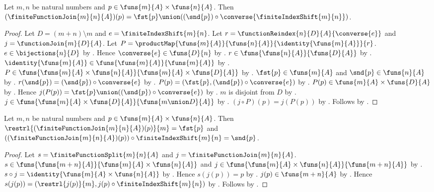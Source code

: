 \begin{theorem}\label{finite_function_join_apply}
    Let $m,n$ be natural numbers and $p\in\funs{m}{A}\times\funs{n}{A}$.
    Then $(\finiteFunctionJoin{m}{n}{A})(p)
        =\fst{p}\union((\snd{p})\circ\converse{\finiteIndexShift{m}{n}})$.
\end{theorem}
\begin{proof}
    Let $D=(m+n)\setminus m$ and $e=\finiteIndexShift{m}{n}$.
    Let $r=\functionReindex{n}{D}{A}{\converse{e}}$ and $j=\functionJoin{m}{D}{A}$.
    Let $P=\productMap{\funs{m}{A}}{\funs{n}{A}}{\identity{\funs{m}{A}}}{r}$.
    $e\in\bijections{n}{D}$ by .
    Hence $\converse{e}\in\funs{D}{n}$ by
        .
    $r\in\funs{\funs{n}{A}}{\funs{D}{A}}$ by .
    $\identity{\funs{m}{A}}\in\funs{\funs{m}{A}}{\funs{m}{A}}$ by .
    $P\in\funs{\funs{m}{A}\times\funs{n}{A}}{\funs{m}{A}\times\funs{D}{A}}$ by
        .
    $\fst{p}\in\funs{m}{A}$ and $\snd{p}\in\funs{n}{A}$ by .
    $r(\snd{p})=(\snd{p})\circ\converse{e}$ by .
    $P(p)=(\fst{p},(\snd{p})\circ\converse{e})$ by .
    $P(p)\in\funs{m}{A}\times\funs{D}{A}$ by .
    Hence $j(P(p))=\fst{p}\union((\snd{p})\circ\converse{e})$ by
        .
    $m$ is disjoint from $D$ by .
    $j\in\funs{\funs{m}{A}\times\funs{D}{A}}{\funs{m\union D}{A}}$ by
        .
    $(j\circ P)(p)=j(P(p))$ by .
    Follows by .
\end{proof}

\begin{theorem}\label{finite_function_join_components}
    Let $m,n$ be natural numbers and $p\in\funs{m}{A}\times\funs{n}{A}$.
    Then $\restrl{(\finiteFunctionJoin{m}{n}{A})(p)}{m}=\fst{p}$ and
        $((\finiteFunctionJoin{m}{n}{A})(p))\circ\finiteIndexShift{m}{n}=\snd{p}$.
\end{theorem}
\begin{proof}
    Let $s=\finiteFunctionSplit{m}{n}{A}$ and $j=\finiteFunctionJoin{m}{n}{A}$.
    $s\in\funs{\funs{m+n}{A}}{\funs{m}{A}\times\funs{n}{A}}$ and
        $j\in\funs{\funs{m}{A}\times\funs{n}{A}}{\funs{m+n}{A}}$ by
        .
    $s\circ j=\identity{\funs{m}{A}\times\funs{n}{A}}$ by
        .
    Hence $s(j(p))=p$ by .
    $j(p)\in\funs{m+n}{A}$ by .
    Hence $s(j(p))=(\restrl{j(p)}{m},j(p)\circ\finiteIndexShift{m}{n})$ by
        .
    Follows by .
\end{proof}

